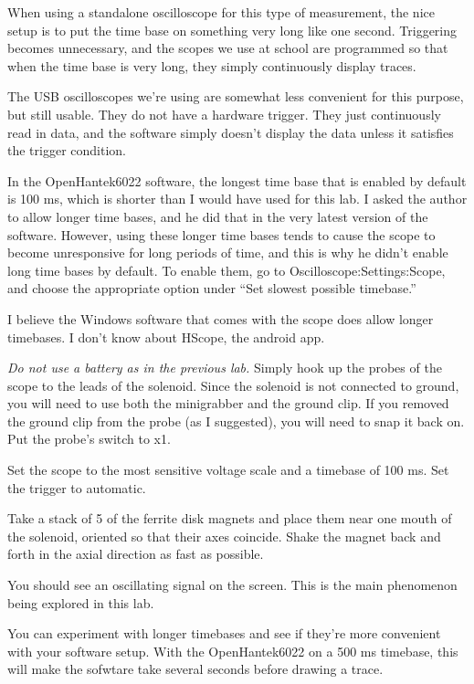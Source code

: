 When using a standalone oscilloscope for this type of measurement, the
nice setup is to put the time base on something very long like one
second.  Triggering becomes unnecessary, and the scopes we use at
school are programmed so that when the time base is very long, they
simply continuously display traces.

The USB oscilloscopes we're using are somewhat less convenient for
this purpose, but still usable. They do not have a hardware trigger.
They just continuously read in data, and the software simply doesn't
display the data unless it satisfies the trigger condition.

In the OpenHantek6022
software, the longest time base that is enabled by default is 100 ms, which is
shorter than I would have used for this lab. I asked the author to allow
longer time bases, and he did that in the very latest version of the software.
However, using these longer time bases tends to cause the scope to become
unresponsive for long periods of time, and this is why he didn't enable long
time bases by default. To enable them, go to Oscilloscope:Settings:Scope,
and choose the appropriate option under ``Set slowest possible timebase.''

I believe the Windows software that comes with the scope does allow longer
timebases. I don't know about HScope, the android app.


\emph{Do not use a battery as in the previous lab.} Simply hook up
the probes of the scope to the leads of the solenoid. Since the solenoid
is not connected to ground, you will need to use both the minigrabber and
the ground clip. If you removed the ground clip from the probe (as I suggested),
you will need to snap it back on. Put the probe's switch to x1.

Set the scope to the most sensitive voltage scale and a timebase of 100 ms.
Set the trigger to automatic.

Take a stack of 5 of the ferrite disk magnets and place them near one
mouth of the solenoid, oriented so that their axes coincide. Shake the
magnet back and forth in the axial direction as fast as possible.

You should see an oscillating signal on the screen. This is the main phenomenon
being explored in this lab.

You can experiment with longer timebases and see if they're more convenient with
your software setup. With the OpenHantek6022 on a 500 ms timebase, this will make the sofwtare take
several seconds before drawing a trace.

